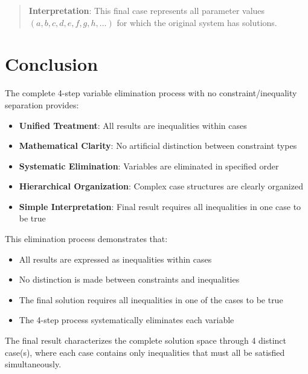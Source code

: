 \documentclass{article}
\newenvironment{stepdetail}
  {\begin{quote}\small\color{blue}}
  {\end{quote}}
\begin{document}
\begin{stepdetail}
\textbf{Interpretation}: This final case represents all parameter values
$(a, b, c, d, e, f, g, h, \ldots)$ for which the original system has solutions.
\end{stepdetail}

\section{Conclusion}

The complete 4-step variable elimination process with no constraint/inequality separation provides:
\begin{itemize}
\item \textbf{Unified Treatment}: All results are inequalities within cases
\item \textbf{Mathematical Clarity}: No artificial distinction between constraint types
\item \textbf{Systematic Elimination}: Variables are eliminated in specified order
\item \textbf{Hierarchical Organization}: Complex case structures are clearly organized
\item \textbf{Simple Interpretation}: Final result requires all inequalities in one case to be true
\end{itemize}

This elimination process demonstrates that:
\begin{itemize}
\item All results are expressed as inequalities within cases
\item No distinction is made between constraints and inequalities
\item The final solution requires all inequalities in one of the cases to be true
\item The 4-step process systematically eliminates each variable
\end{itemize}

The final result characterizes the complete solution space through
4 distinct case(s), where each case contains only inequalities
that must all be satisfied simultaneously.
\end{document}
